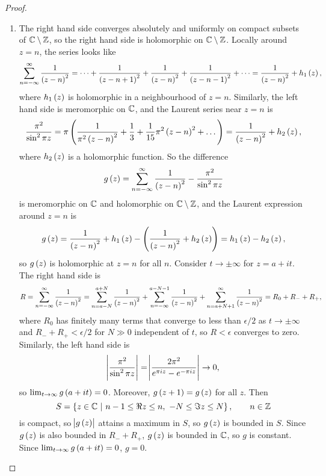 \begin{proof}
\hfill
\begin{enumerate}
\item The right hand side converges absolutely and uniformly on compact subsets of $ \mathbb{C} \setminus \mathbb{Z} $, so the right hand side is holomorphic on $ \mathbb{C} \setminus \mathbb{Z} $. Locally around $ z = n $, the series looks like
$$ \sum_{n = -\infty}^\infty \dfrac{1}{\br{z - n}^2} = \dots + \dfrac{1}{\br{z - n + 1}^2} + \dfrac{1}{\br{z - n}^2} + \dfrac{1}{\br{z - n - 1}^2} + \dots = \dfrac{1}{\br{z - n}^2} + h_1\br{z}, $$
where $ h_1\br{z} $ is holomorphic in a neighbourhood of $ z = n $. Similarly, the left hand side is meromorphic on $ \mathbb{C} $, and the Laurent series near $ z = n $ is
$$ \dfrac{\pi^2}{\sin^2 \pi z} = \pi\br{\dfrac{1}{\pi^2\br{z - n}^2} + \dfrac{1}{3} + \dfrac{1}{15}\pi^2\br{z - n}^2 + \dots} = \dfrac{1}{\br{z - n}^2} + h_2\br{z}, $$
where $ h_2\br{z} $ is a holomorphic function. So the difference
$$ g\br{z} = \sum_{n = -\infty}^\infty \dfrac{1}{\br{z - n}^2} - \dfrac{\pi^2}{\sin^2 \pi z} $$
is meromorphic on $ \mathbb{C} $ and holomorphic on $ \mathbb{C} \setminus \mathbb{Z} $, and the Laurent expression around $ z = n $ is
$$ g\br{z} = \dfrac{1}{\br{z - n}^2} + h_1\br{z} - \br{\dfrac{1}{\br{z - n}^2} + h_2\br{z}} = h_1\br{z} - h_2\br{z}, $$
so $ g\br{z} $ is holomorphic at $ z = n $ for all $ n $. Consider $ t \to \pm\infty $ for $ z = a + it $. The right hand side is
$$ R = \sum_{n = -\infty}^\infty \dfrac{1}{\br{z - n}^2} = \sum_{n = a - N}^{a + N} \dfrac{1}{\br{z - n}^2} + \sum_{n = -\infty}^{a - N - 1} \dfrac{1}{\br{z - n}^2} + \sum_{n = a + N + 1}^\infty \dfrac{1}{\br{z - n}^2} = R_0 + R_- + R_+, $$
where $ R_0 $ has finitely many terms that converge to less than $ \epsilon / 2 $ as $ t \to \pm\infty $ and $ R_- + R_+ < \epsilon / 2 $ for $ N \gg 0 $ independent of $ t $, so $ R < \epsilon $ converges to zero. Similarly, the left hand side is
$$ \abs{\dfrac{\pi^2}{\sin^2 \pi z}} = \abs{\dfrac{2\pi^2}{e^{\pi iz} - e^{-\pi iz}}} \to 0, $$
so $ \lim_{t \to \infty} g\br{a + it} = 0 $. Moreover, $ g\br{z + 1} = g\br{z} $ for all $ z $. Then
$$ S = \cbr{z \in \CC \st n - 1 \le \Re z \le n, \ -N \le \Im z \le N}, \qquad n \in \ZZ $$
is compact, so $ \abs{g\br{z}} $ attains a maximum in $ S $, so $ g\br{z} $ is bounded in $ S $. Since $ g\br{z} $ is also bounded in $ R_- + R_+ $, $ g\br{z} $ is bounded in $ \mathbb{C} $, so $ g $ is constant. Since $ \lim_{t \to \infty} g\br{a + it} = 0 $, $ g = 0 $.

\pagebreak



\end{enumerate}
\end{proof}
